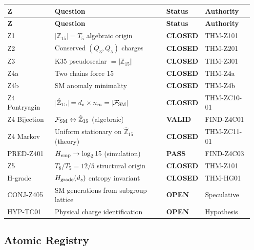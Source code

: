 \documentclass[12pt, a4paper]{article}
\begin{document}
\begin{derivedbox}[title={Z-Programme: Closure Summary (post ZC11)}]
{\small
\renewcommand{\arraystretch}{1.30}
\begin{longtable}{%
  >{\centering\arraybackslash}p{1.5cm}
  >{\raggedright\arraybackslash}p{6.5cm}
  >{\centering\arraybackslash}p{2.2cm}
  >{\raggedright\arraybackslash}p{3.0cm}}
\toprule
\textbf{Z} & \textbf{Question} & \textbf{Status} & \textbf{Authority} \\
\midrule\endfirsthead
\toprule
\textbf{Z} & \textbf{Question} & \textbf{Status} & \textbf{Authority} \\
\midrule\endhead\bottomrule\endlastfoot
Z1 & $|\mathbb{Z}_{15}| = T_5$ algebraic origin
  & \textbf{CLOSED} & THM-Z101 \\
Z2 & Conserved $(Q_3, Q_5)$ charges
  & \textbf{CLOSED} & THM-Z201 \\
Z3 & K35 pseudoscalar $= |\mathbb{Z}_{15}|$
  & \textbf{CLOSED} & THM-Z301 \\
Z4a & Two chains force 15
  & \textbf{CLOSED} & THM-Z4a \\
Z4b & SM anomaly minimality
  & \textbf{CLOSED} & THM-Z4b \\
Z4 Pontryagin & $|\hat{\mathbb{Z}}_{15}| = d_s \times n_m = |\mathcal{F}_{\rm SM}|$
  & \textbf{CLOSED} & THM-ZC10-01 \\
Z4 Bijection & $\mathcal{F}_{\rm SM} \leftrightarrow \hat{\mathbb{Z}}_{15}$
  (algebraic)
  & \textbf{VALID} & FIND-Z4C01 \\
Z4 Markov & Uniform stationary on $\hat{\mathbb{Z}}_{15}$ (theory)
  & \textbf{CLOSED} & THM-ZC11-01 \\
PRED-Z401 & $H_{\rm emp} \to \log_2 15$ (simulation)
  & \textbf{PASS} & FIND-Z4C03 \\
Z5 & $T_8/T_5 = 12/5$ structural origin
  & \textbf{CLOSED} & THM-Z101 \\
H-grade & $H_{\rm grade}(d_s)$ entropy invariant
  & \textbf{CLOSED} & THM-HG01 \\
\midrule
CONJ-Z405 & 3 SM generations from subgroup lattice
  & \textbf{OPEN} & Speculative \\
HYP-TC01 & Physical charge identification
  & \textbf{OPEN} & Hypothesis \\
\end{longtable}
}
\end{derivedbox}

\subsection{Atomic Registry}
\label{sec:registry}
\end{document}
